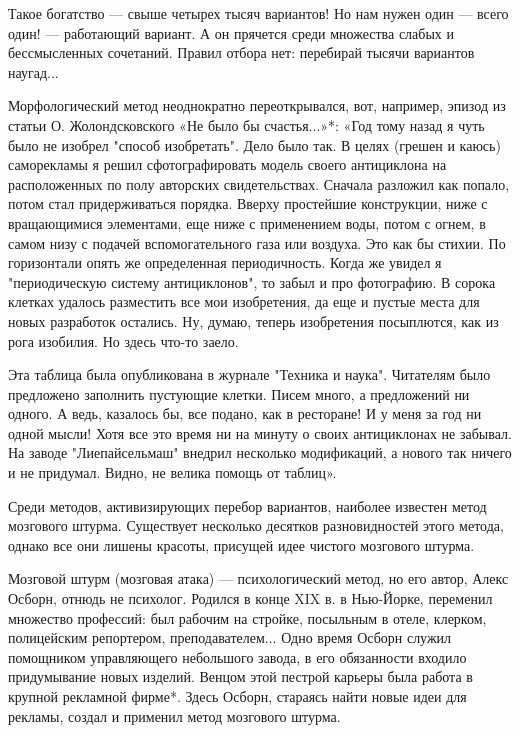 Такое богатство —  свыше четырех тысяч вариантов! Но нам  нужен один —
всего  один!  — работающий  вариант.  А  он прячется  среди  множества
слабых и бессмысленных сочетаний.  Правил отбора нет: перебирай тысячи
вариантов наугад...


Морфологический  метод  неоднократно  переоткрывался,  вот,  например,
эпизод из  статьи О.  Жолондсковского «Не  было бы  счастья...»*: «Год
тому назад я чуть было не  изобрел "способ изобретать". Дело было так.
В целях (грешен  и каюсь) саморекламы я  решил сфотографировать модель
своего антициклона на расположенных  по полу авторских свидетельствах.
Сначала  разложил  как  попало,  потом  стал  придерживаться  порядка.
Вверху  простейшие конструкции,  ниже с  вращающимися элементами,  еще
ниже  с применением  воды,  потом  с огнем,  в  самом  низу с  подачей
вспомогательного газа или  воздуха. Это как бы  стихии. По горизонтали
опять же определенная периодичность.  Когда же увидел я "периодическую
систему антициклонов",  то забыл  и про  фотографию. В  сорока клетках
удалось  разместить все  мои изобретения,  да еще  и пустые  места для
новых разработок  остались. Ну, думаю, теперь  изобретения посыплются,
как из рога изобилия. Но здесь что-то заело.

Эта таблица была  опубликована в журнале "Техника  и наука". Читателям
было предложено заполнить пустующие клетки. Писем много, а предложений
ни одного. А ведь, казалось бы, все  подано, как в ресторане! И у меня
за  год ни  одной мысли!  Хотя  все это  время  ни на  минуту о  своих
антициклонах не  забывал. На заводе "Лиепайсельмаш"  внедрил несколько
модификаций,  а нового  так ничего  и  не придумал.  Видно, не  велика
помощь от таблиц».

Среди  методов, активизирующих  перебор  вариантов, наиболее  известен
метод мозгового  штурма. Существует несколько  десятков разновидностей
этого метода,  однако все  они лишены  красоты, присущей  идее чистого
мозгового штурма.


Мозговой штурм (мозговая атака) — психологический метод, но его автор,
Алекс Осборн, отнюдь не психолог. Родился  в конце XIX в. в Нью-Йорке,
переменил  множество  профессий:  был рабочим  на  стройке,  посыльным
в  отеле,  клерком,  полицейским  репортером,  преподавателем...  Одно
время Осборн  служил помощником управляющего небольшого  завода, в его
обязанности входило  придумывание новых  изделий. Венцом  этой пестрой
карьеры была работа в крупной рекламной фирме*. Здесь Осборн, стараясь
найти  новые  идеи для  рекламы,  создал  и применил  метод  мозгового
штурма.

